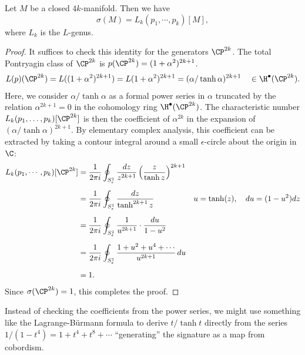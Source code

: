 \begin{theorem}[Hirzebruch]\label{thm:hirzebruch-signature-theorem}
	Let $M$ be a closed $4k$-manifold. Then we have
	\[
		\sigma(M) = L_k(p_1, \cdots, p_k)[M],
	\]
	where $L_k$ is the $L$-genus.
\end{theorem}
\begin{proof}
	It suffices to check this identity for the generators $\CP^{2k}$. The total Pontryagin class of $\CP^{2k}$ is $p(\CP^{2k})=(1+\alpha^2)^{2k+1}$.
	\[
		\begin{aligned}
			L(p)(\CP^{2k})
			= L((1+\alpha^2)^{2k+1})
			= L(1+\alpha^2)^{2k+1}
			= (\alpha/\tanh \alpha)^{2k+1}
			\quad\in\H^\bullet(\CP^{2k}).
		\end{aligned}
	\]
	Here, we consider $\alpha/\tanh \alpha$ as a formal power series in $\alpha$ truncated by the relation $\alpha^{2k+1}=0$ in the cohomology ring $\H^\bullet(\CP^{2k})$. The characteristic number $L_k(p_1,\ldots,p_k)[\CP^{2k}]$ is then the coefficient of $\alpha^{2k}$ in the expansion of $(\alpha/\tanh \alpha)^{2k+1}$.
	By elementary complex analysis, this coefficient can be extracted by taking a contour integral around a small $\epsilon$-circle about the origin in $\C$:
	\[
		\begin{aligned}
			L_k(p_1,\cdots, p_k)[\CP^{2k}]
			 & = \frac{1}{2\pi i}\oint_{S^1_\epsilon} \frac{dz}{z^{2k+1}} \left(\frac{z}{\tanh z}\right)^{2k+1}
			 &                                                                                                    \\[0.5em]
			 & = \frac{1}{2\pi i}\oint_{S^1_\epsilon} \frac{dz}{\tanh^{2k+1} z}\quad
			 & u  =\tanh(z),\quad
			du =(1-u^2)dz
			\\[0.5em]
			 & = \frac{1}{2\pi i}\oint_{S^1_\epsilon} \frac{1}{u^{2k+1}}\cdot\frac{du}{1-u^2}
			 &                                                                                                    \\[0.5em]
			 & = \frac{1}{2\pi i}\oint_{S^1_\epsilon} \frac{1+u^2+u^4+\cdots}{u^{2k+1}}\,du                       \\[0.5em]
			 & =1.                                                                                              &
		\end{aligned}
	\]
	Since $\sigma(\CP^{2k})=1$, this completes the proof.
\end{proof}

\begin{remark}
	Instead of checking the coefficients from the power series, we might use something like the Lagrange-B\"urmann formula to derive $t/\tanh t$ directly from the series $1/(1-t^4)=1+t^4+t^8+\cdots$ ``generating'' the signature as a map from cobordism. 
\end{remark}

